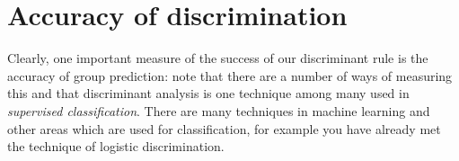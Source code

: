 













\section{Accuracy of discrimination}  
\label{accuracy}

Clearly, one important measure of the success of our discriminant rule is the accuracy of group prediction: note that there are a number of ways of measuring this and that discriminant analysis is one technique among many used in \emph{supervised classification}.   There are many techniques in machine learning and other areas which are used for classification, for example you have already met the technique of logistic discrimination.   

